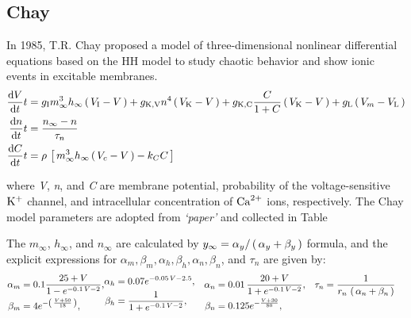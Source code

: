\documentclass[../../Orator.tex]{subfiles}
\begin{document}
\subsection{Chay}

In 1985, T.R. Chay proposed a model of three-dimensional nonlinear differential equations based on the HH model to study chaotic behavior and show ionic events in excitable membranes. 
\begin{subequations} \label{eq:ChaySys}
    \begin{align}
        \ode{V}{t} &= g_\rmm{I}  m^3_\infty h_\infty \br{V_\rmm{I} - V} + g_\rmm{K, V} n^4 \br{V_\rmm{K} - V} + g_\rmm{K, C}  \frac{C}{1+C}\br{V_\rmm{K} - V} + g_\rmm{L} \br{V_m - V_\rmm{L}} \\ 
        \ode{n}{t} &= \frac{n_\infty - n}{\tau_n} \\
        \ode{C}{t} &= \rho \, \sbr{m^3_\infty h_\infty \br{V_c - V} - k_C C}
    \end{align}
\end{subequations}

where \textit{V}, \textit{n}, and \textit{C} are membrane potential, probability of the voltage-sensitive \(\mathrm{K}^+\) channel, and intracellular concentration of \(\mathrm{Ca}^{2+}\) ions, respectively. The Chay model parameters are adopted from \textit{`paper'} and collected in Table

The \(m_\infty\), \(h_\infty\), and \(n_\infty\) are calculated by \(y_\infty = \alpha_y / \br{\alpha_y + \beta_y} \) formula, and the explicit expressions for 
\(\alpha_m, \beta_m, \alpha_h, \beta_h, \alpha_n, \beta_n\), and \(\tau_n\) are given by:
{
\begin{align*}
    \begin{split}
        \alpha_m &= 0.1 \frac{ 25 + V }{1 - e^{-0.1 \, V - 2}}, \\
        \beta_m  &= 4 e^{-\br{\frac{ V + 50 }{ 18 } } }, 
    \end{split} &
    \begin{split}
        \alpha_h &=  0.07 e^{-0.05\,V -2.5}, \\
        \beta_h  &= \frac{ 1 }{ 1 + e^{-0.1 \, V - 2}},
    \end{split} &
    \begin{split}
        \alpha_n &= 0.01 \, \frac{ 20 + V }{ 1 + e^{-0.1 \, V - 2}}, \\
        \beta_n  &= 0.125 e^{- \frac{V + 30}{80}},
    \end{split} &
    \begin{split}
    \tau_n &= \frac{1}{ r_n \, \br{\alpha_n + \beta_n} } \\
    \phantom{fart}
    \end{split}
\end{align*}
}
\end{document}
